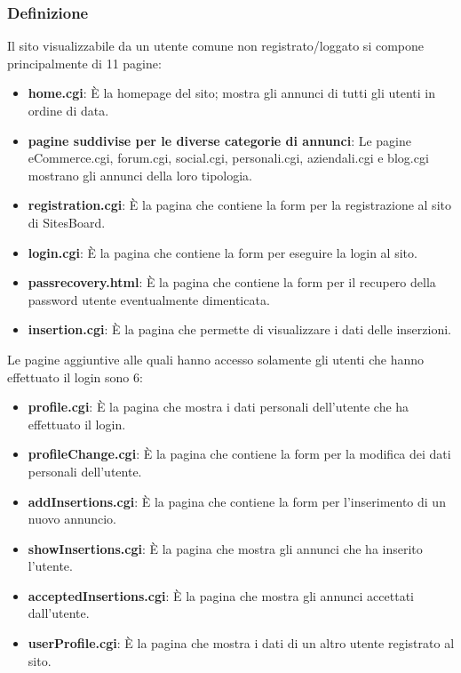 \documentclass[12pt]{article}
\begin{document}
		\subsubsection{Definizione}
	
		Il sito visualizzabile da un utente comune non registrato/loggato si compone principalmente di 11 pagine:
		
		\begin{itemize}
			\item \textbf{home.cgi}: È la homepage del sito; mostra gli annunci di tutti gli utenti in ordine di data.
			\item \textbf{pagine suddivise per le diverse categorie di annunci}: Le pagine eCommerce.cgi, forum.cgi, social.cgi, personali.cgi, aziendali.cgi e blog.cgi mostrano gli annunci della loro tipologia.
			\item \textbf{registration.cgi}: È la pagina che contiene la form per la registrazione al sito di SitesBoard.
			\item \textbf{login.cgi}: È la pagina che contiene la form per eseguire la login al sito.
			\item \textbf{pass\textunderscore recovery.html}: È la pagina che contiene la form per il recupero della password utente eventualmente dimenticata.\\
			\item \textbf{insertion.cgi}: È la pagina che permette di visualizzare i dati delle inserzioni.
		\end{itemize}
		Le pagine aggiuntive alle quali hanno accesso solamente gli utenti che hanno effettuato il login sono 6:
		
		\begin{itemize}
			\item \textbf{profile.cgi}: È la pagina che mostra i dati personali dell'utente che ha effettuato il login.
			\item \textbf{profileChange.cgi}: È la pagina che contiene la form per la modifica dei dati personali dell'utente.
			\item \textbf{addInsertions.cgi}: È la pagina che contiene la form per l'inserimento di un nuovo annuncio.
			\item \textbf{showInsertions.cgi}: È la pagina che mostra gli annunci che ha inserito l'utente.
			\item \textbf{acceptedInsertions.cgi}: È la pagina che mostra gli annunci accettati dall'utente.
			\item \textbf{userProfile.cgi}: È la pagina che mostra i dati di un altro utente registrato al sito.
		\end{itemize}
		
\end{document}
